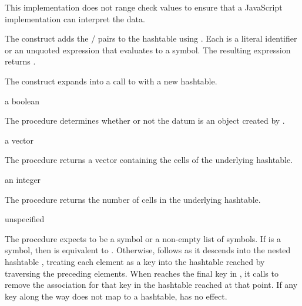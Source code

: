 This implementation does not range check values to ensure that a
JavaScript implementation can interpret the data.

\begin{syntax}
\end{syntax}

The  construct adds the  /
 pairs to the hashtable  using
. Each  is a literal identifier
or an unquoted expression  that evaluates to a
symbol. The resulting expression returns .

\begin{syntax}
\end{syntax}

The  construct expands into a call to
 with a new hashtable.

\begin{procedure}
\end{procedure}
\returns{} a boolean

The  procedure determines whether or not the datum
 is an object created by .

\begin{procedure}
\end{procedure}
\returns{} a vector

The  procedure returns a vector containing the
cells of the underlying hashtable.

\begin{procedure}
\end{procedure}
\returns{} an integer

The  procedure returns the number of cells
in the underlying hashtable.

\begin{procedure}
\end{procedure}
\returns{} unspecified

The  procedure expects  to be a symbol or
a non-empty list of symbols.
If  is a symbol, then  is equivalent
to .
Otherwise,  follows  as it descends into
the nested hashtable , treating each element as a key into
the hashtable reached by traversing the preceding elements.
When  reaches the final key in ,
it calls  to remove the association for
that key in the hashtable reached at that point.
If any key along the way does not map to a hashtable,
 has no effect.

